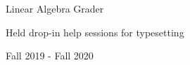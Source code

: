 \begin{cventries}
  \cventrysubteaching
    {Linear Algebra Grader}
    {
      \begin{cvitems}
        \item {Held drop-in help sessions for typesetting}
      \end{cvitems}
    }
    {Fall 2019 - Fall 2020}













\end{cventries}
